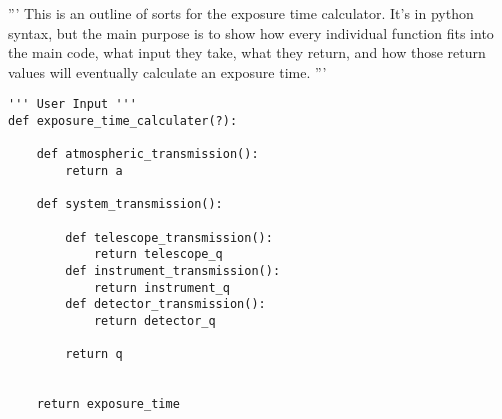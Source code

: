 \documentclass{article}
\begin{document}
'''
This is an outline of sorts for the exposure time calculator.
It's in python syntax, but the main purpose is to show how every
individual function fits into the main code, what input they take,
what they return, and how those return values will eventually
calculate an exposure time.
'''

\begin{verbatim}
''' User Input '''
def exposure_time_calculater(?):

    def atmospheric_transmission():
        return a

    def system_transmission():

        def telescope_transmission():
            return telescope_q
        def instrument_transmission():
            return instrument_q
        def detector_transmission():
            return detector_q

        return q


    return exposure_time

\end{verbatim}
\end{document}
